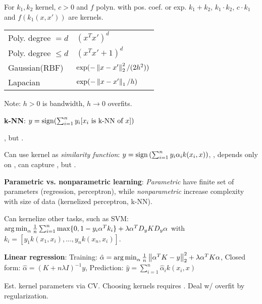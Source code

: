 For $k_1, k_2$ kernel, $c > 0$ and $f$ polyn. with pos. coef. or exp.
$k_1 + k_2$, $k_1 \cdot k_2$, $c \cdot k_1$ and $f(k_1(x,x'))$
are kernels.

\begin{tabular}{ll}
    Poly. degree $= d$ & $(x^T x')^d$ \\
    Poly. degree $\leq d$ & $(x^T x' + 1)^d$ \\
    Gaussian(RBF) & $\exp(-\left\lVert x-x'\right\rVert_2^2/(2h^2))$ \\
    Lapacian & $\exp(-\left\lVert x-x'\right\rVert_1/h)$ \\
\end{tabular}

Note: $h > 0$ is bandwidth, $h \rightarrow 0$ overfits.

\textbf{k-NN}: $y = \operatorname*{sign}(\sum_{i=1}^n y_i [\text{$x_i$ is k-NN of $x$}])$

, but .

Can use kernel as \emph{similarity function}:  $y = \operatorname*{sign}\left(\sum_{i=1}^n y_i \alpha_i k(x_i, x)\right)$, , depends only on , can capture , but .

\textbf{Parametric vs. nonparametric learning}: \emph{Parametric} have finite set of parameters (regression, perceptron), while
\emph{nonparametric} increase complexity with size of data (kernelized perceptron, k-NN).

Can kernelize other tasks, such as SVM: $\operatorname*{arg\,min}_\alpha \frac{1}{n} \sum_{i=1}^n \max\{0, 1-y_i\alpha^Tk_i\} + \lambda \alpha^TD_y K D_y \alpha$ with $k_i = [y_1 k(x_1,x_i), ... , y_n k(x_n, x_i)]$.

\textbf{Linear regression}: Training: $\hat{\alpha} = \operatorname*{arg\,min}_\alpha \frac{1}{n} \left\lVert\alpha^TK-y\right\rVert_2^2 + \lambda \alpha^T K \alpha$, Closed form: $\hat{\alpha} = (K + n \lambda I)^{-1} y$, Prediction: $\hat{y} = \sum_{i=1}^n \hat{\alpha}_i k(x_i, x)$

Est. kernel parameters via CV. Choosing kernels requires . Deal w/ overfit by regularization.
